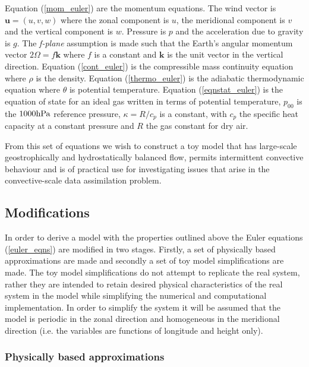 \documentclass[times]{qjrms4}
\begin{document}
Equation (\ref{mom_euler}) are the momentum equations. The wind vector is $\mathbf u = (u, v, w)$ 
where the zonal component is $u$, the meridional component is $v$ and the vertical 
component is $w$. Pressure is $p$ and the acceleration due to gravity is $g$. 
The \textit{f-plane} assumption is made such that the Earth's angular momentum vector $2\Omega = f \mathbf k$ where $f$ 
is a constant and $\mathbf k$ is the unit vector in the vertical direction.
Equation (\ref{cont_euler}) is the compressible mass continuity equation where $\rho$ is the density.  
Equation (\ref{thermo_euler}) is the adiabatic thermodynamic equation where $\theta$ is potential 
temperature. Equation (\ref{eqnstat_euler}) is the equation of state for an ideal gas written in 
terms of potential temperature, $p_{00}$ is the $1000 \rm{ hPa}$ reference pressure, 
$\kappa = R/{c_p}$ is a constant, with $c_p$ the specific heat capacity at a constant pressure 
and $R$ the gas constant for dry air. 

From this set of equations we wish to construct a toy model that has large-scale geostrophically and
hydrostatically balanced flow, permits intermittent convective behaviour and is of practical use
for investigating issues that arise in the convective-scale data assimilation problem.


\subsection{Modifications}

In order to derive a model with the properties outlined above 
the Euler equations (\ref{euler_eqns}) are modified in two stages. Firstly, a set of physically based approximations are made and secondly a set of 
toy model simplifications are made. The toy model simplifications do not attempt to replicate 
the real system, rather they are intended to retain desired physical characteristics of the real system
in the model while simplifying the numerical and computational implementation.
In order to simplify the system it will be assumed that the model is periodic in the zonal direction 
and homogeneous in the meridional direction (i.e. the variables are functions
of longitude and height only). 

\subsubsection{Physically based approximations}
\end{document}
